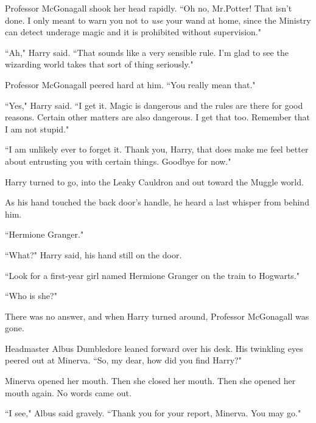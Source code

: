 Professor McGonagall shook her head rapidly. ``Oh no, Mr.\?Potter! That isn't done. I only meant to warn you not to \emph{use} your wand at home, since the Ministry can detect underage magic and it is prohibited without supervision."

``Ah," Harry said. ``That sounds like a very sensible rule. I'm glad to see the wizarding world takes that sort of thing seriously."

Professor McGonagall peered hard at him. ``You really mean that."

``Yes," Harry said. ``I get it. Magic is dangerous and the rules are there for good reasons. Certain other matters are also dangerous. I get that too. Remember that I am not stupid."

``I am unlikely ever to forget it. Thank you, Harry, that does make me feel better about entrusting you with certain things. Goodbye for now."

Harry turned to go, into the Leaky Cauldron and out toward the Muggle world.

As his hand touched the back door's handle, he heard a last whisper from behind him.

``Hermione Granger."

``What?" Harry said, his hand still on the door.

``Look for a first-year girl named Hermione Granger on the train to Hogwarts."

``Who is she?"

There was no answer, and when Harry turned around, Professor McGonagall was gone.


Headmaster Albus Dumbledore leaned forward over his desk. His twinkling eyes peered out at Minerva. ``So, my dear, how did you find Harry?"

Minerva opened her mouth. Then she closed her mouth. Then she opened her mouth again. No words came out.

``I see," Albus said gravely. ``Thank you for your report, Minerva. You may go."

